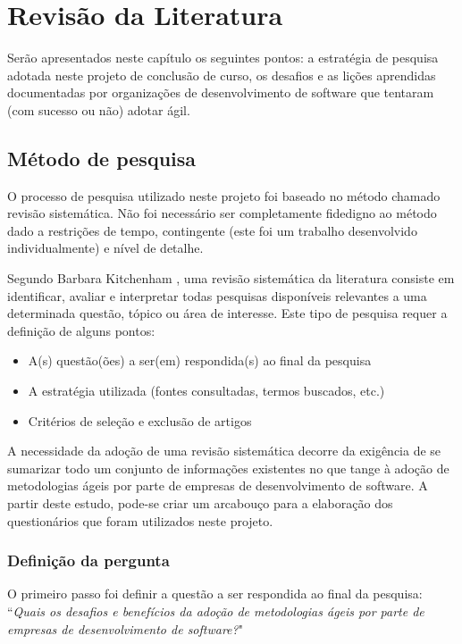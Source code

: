 
\chapter{Revisão da Literatura}
	Serão apresentados neste capítulo os seguintes pontos: a estratégia de pesquisa adotada neste projeto de conclusão de curso, os desafios e as lições aprendidas documentadas por organizações de desenvolvimento de software que tentaram (com sucesso ou não) adotar ágil.
	\section{Método de pesquisa}
		O processo de pesquisa utilizado neste projeto foi baseado no método chamado revisão sistemática. Não foi necessário ser completamente fidedigno ao método dado a restrições de tempo, contingente (este foi um trabalho desenvolvido individualmente) e nível de detalhe.
		
		Segundo Barbara Kitchenham \cite{Barbara04}, uma revisão sistemática da literatura consiste em identificar, avaliar e interpretar todas pesquisas disponíveis relevantes a uma determinada questão, tópico ou área de interesse. Este tipo de pesquisa requer a definição de alguns pontos:
		\begin{itemize}
			\item A(s) questão(ões) a ser(em) respondida(s) ao final da pesquisa
			\item A estratégia utilizada (fontes consultadas, termos buscados, etc.)
			\item Critérios de seleção e exclusão de artigos
		\end{itemize}
		A necessidade da adoção de uma revisão sistemática decorre da exigência de se sumarizar todo um conjunto de informações existentes no que tange à adoção de metodologias ágeis por parte de empresas de desenvolvimento de software. A partir deste estudo, pode-se criar um arcabouço para a elaboração dos questionários que foram utilizados neste projeto.
		\subsection{Definição da pergunta}
			O primeiro passo foi definir a questão a ser respondida ao final da pesquisa: ``\textit{Quais os desafios e benefícios da adoção de metodologias ágeis por parte de empresas de desenvolvimento de software?}"
